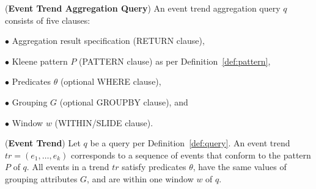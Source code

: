 %
%
%




\begin{definition}(\textbf{Event Trend Aggregation Query})
%
An event trend aggregation query $q$ consists of five clauses:

$\bullet$ Aggregation result specification (\textsf{RETURN} clause),

$\bullet$ Kleene pattern $P$ (\textsf{PATTERN} clause) as per Definition~\ref{def:pattern},

$\bullet$ Predicates $\theta$ (optional \textsf{WHERE} clause),

$\bullet$ Grouping $G$ (optional \textsf{GROUPBY} clause), and

$\bullet$ Window $w$ (\textsf{WITHIN/SLIDE} clause).
%
\label{def:query}
\end{definition}

\begin{definition}(\textbf{Event Trend})
%
Let $q$ be a query per Definition~\ref{def:query}.
An event trend $tr = (e_1, \ldots, e_k)$ corresponds to a sequence of events that conform to the pattern $P$ of $q$. All events in a trend $tr$ satisfy predicates $\theta$, have the same values of grouping attributes $G$, and are within one window $w$ of $q$. 
%
\label{def:trend}
\end{definition}

